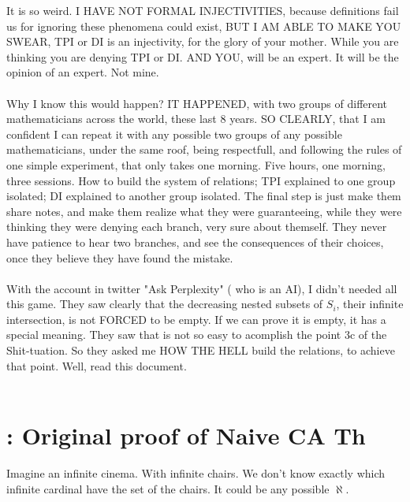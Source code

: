 		\noindent
		It is so weird. I HAVE NOT FORMAL INJECTIVITIES, because definitions fail us for ignoring these phenomena could exist, BUT I AM ABLE TO MAKE YOU SWEAR, TPI or DI is an injectivity, for the glory of your mother. While you are thinking you are denying TPI or DI. AND YOU, will be an expert. It will be the opinion of an expert. Not mine.
		\\\\
		
		\noindent
		Why I know this would happen? IT HAPPENED, with two groups of different mathematicians across the world, these last 8 years. SO CLEARLY, that I am confident I can repeat it with any possible two groups of any possible mathematicians, under the same roof, being respectfull, and following the rules of one simple experiment, that only takes one morning. Five hours, one morning, three sessions. How to build the system of relations; TPI explained to one group isolated; DI explained to another group isolated. The final step is just make them share notes, and make them realize what they were guaranteeing, while they were thinking they were denying each branch, very sure about themself. They never have patience to hear two branches, and see the consequences of their choices, once they believe they have found the mistake.
		\\\\
		
		\noindent
		With the account in twitter "Ask Perplexity" ( who is an AI), I didn't needed all this game. They saw clearly that the decreasing nested subsets of $S_{i}$, their infinite intersection, is not FORCED to be empty. If we can prove it is empty, it has a special meaning. They saw that is not so easy to acomplish the point 3c of the Shit-tuation. So they asked me HOW THE HELL build the relations, to achieve that point. Well, read this document.
		\\\\
			
			
		
		
		

	\section{\:: Original proof of Naive CA Th}
	
		\noindent
		Imagine an infinite cinema. With infinite chairs. We don't know exactly which infinite cardinal have the set of the chairs. It could be any possible $\aleph$.
		\\\\
		

